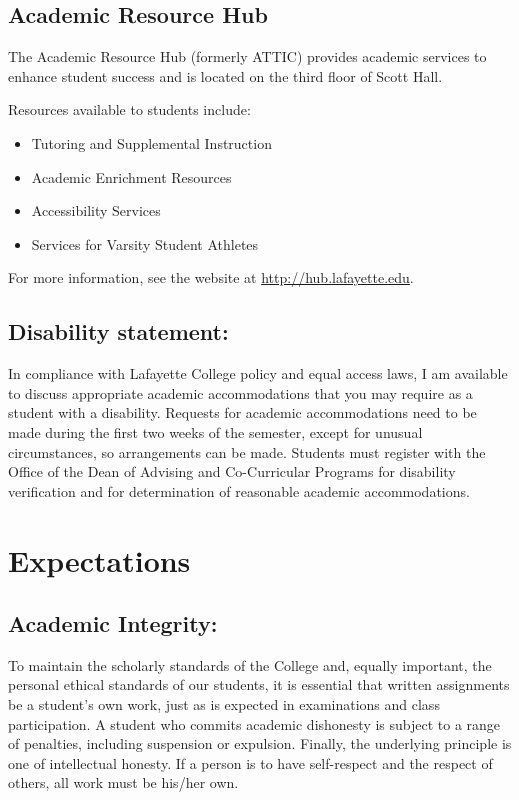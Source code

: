 \documentclass[12pt]{amsart}
\begin{document}
\subsection*{Academic Resource Hub}
\noindent
The Academic Resource Hub (formerly ATTIC) provides academic services to enhance student success and is located on the third floor of Scott Hall.

Resources available to students include:
\begin{itemize}
\item 
  Tutoring and Supplemental Instruction
\item
  Academic Enrichment Resources
\item
  Accessibility Services
\item
  Services for Varsity Student Athletes
\end{itemize}
For more information, see the website at \url{http://hub.lafayette.edu}.

\subsection*{Disability statement:}
In compliance with Lafayette College policy and equal access laws, I am available to discuss appropriate academic accommodations that you may require as a student with a disability.  Requests for academic accommodations need to be made during the first two weeks of the semester, except for unusual circumstances, so arrangements can be made.  Students must register with the Office of the Dean of Advising and Co-Curricular Programs for disability verification and for determination of reasonable academic accommodations.


\section*{Expectations}
\noindent
\subsection*{Academic Integrity:}
To maintain the scholarly standards of the College and, equally important, the personal ethical standards of our students, it is essential that written assignments be a student’s own work, just as is expected in examinations and class participation. A student who commits academic dishonesty is subject to a range of penalties, including suspension or expulsion. Finally, the underlying principle is one of intellectual honesty. If a person is to have self-respect and the respect of others, all work must be his/her own.
\end{document}
